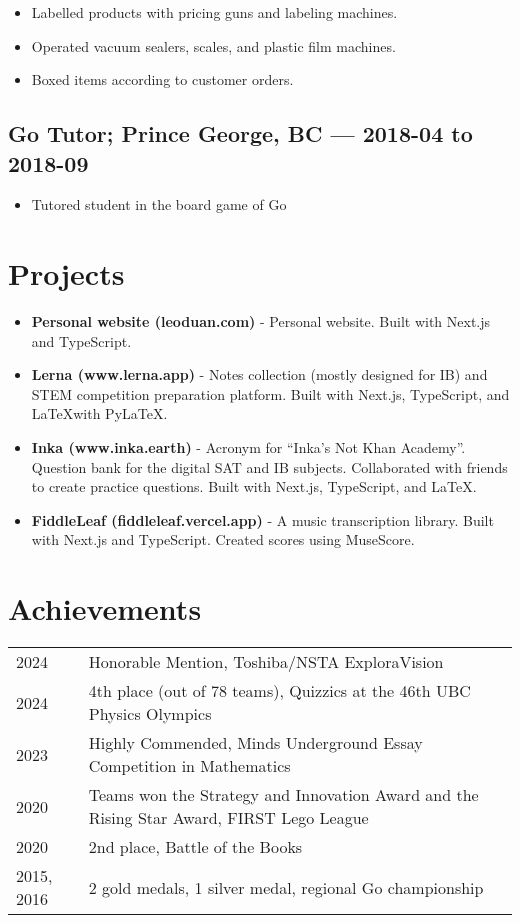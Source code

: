 \documentclass{article}
\begin{document}
\begin{itemize}
	\item Labelled products with pricing guns and labeling machines.
	\item Operated vacuum sealers, scales, and plastic film machines.
	\item Boxed items according to customer orders.
\end{itemize}

\subsection*{Go Tutor; Prince George, BC — 2018-04 to 2018-09}

\begin{itemize}
	\item Tutored student in the board game of Go
\end{itemize}

\section*{Projects}

\begin{itemize}
	\item \textbf{Personal website (leoduan.com)} - Personal website. Built with Next.js and TypeScript.
	\item \textbf{Lerna (www.lerna.app)} - Notes collection (mostly designed for IB) and STEM competition preparation platform. Built with Next.js, TypeScript, and \LaTeX with PyLaTeX.
	\item \textbf{Inka (www.inka.earth)} - Acronym for ``Inka's Not Khan Academy''. Question bank for the digital SAT and IB subjects. Collaborated with friends to create practice questions. Built with Next.js, TypeScript, and \LaTeX.
	\item \textbf{FiddleLeaf (fiddleleaf.vercel.app)} - A music transcription library. Built with Next.js and TypeScript. Created scores using MuseScore.
\end{itemize}

\section*{Achievements}

\begin{tabular}{@{}ll}
	2024       & Honorable Mention, Toshiba/NSTA ExploraVision                                            \\
	2024       & 4th place (out of 78 teams), Quizzics at the 46th UBC Physics Olympics                   \\
	2023       & Highly Commended, Minds Underground Essay Competition in Mathematics                     \\
	2020       & Teams won the Strategy and Innovation Award and the Rising Star Award, FIRST Lego League \\
	2020       & 2nd place, Battle of the Books                                                           \\
	2015, 2016 & 2 gold medals, 1 silver medal, regional Go championship
\end{tabular}
\end{document}
